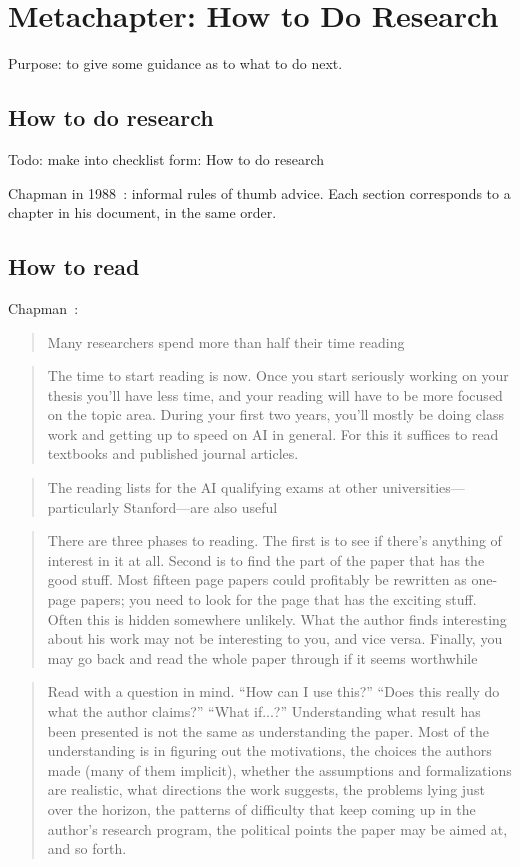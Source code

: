 \chapter{Metachapter: How to Do Research}

Purpose: to give some guidance as to what to do next.

\section{How to do research}
Todo: make into checklist form: How to do research \cite{chapman1988how}
\cite{hwang2008how}
\cite{desjardins2008how}

Chapman in 1988~\cite{chapman1988how}: informal rules of thumb advice. Each
section corresponds to a chapter in his document, in the same order.


\section{How to read}

Chapman~\cite{chapman1988how}:
\blockquote{Many researchers spend more than half their time reading}

\blockquote{The time to start reading is now. Once you start seriously working
on your thesis you’ll have less time, and your reading will have to be more
focused on the topic area. During your first two years, you’ll mostly be doing
class work and getting up to speed on AI in general. For this it suffices to
read textbooks and published journal articles.}

\blockquote{The reading lists for the AI qualifying exams at other
universities—particularly Stanford—are also useful}

\blockquote{There are three phases to reading. The
first is to see if there’s anything of interest in it at all. Second is to find
the part of the paper that has the good stuff. Most fifteen page papers could
profitably be rewritten as one-page papers; you need to look for the page that
has the exciting stuff. Often this is hidden somewhere unlikely. What the author
finds interesting about his work may not be interesting to you, and vice versa.
Finally, you may go back and read the whole paper through if it seems
worthwhile}

\blockquote{Read with a question in mind. “How can I use this?” “Does this really do
what the author claims?” “What if...?” Understanding what result has been presented
is not the same as understanding the paper. Most of the understanding
is in figuring out the motivations, the choices the authors made (many of them
implicit), whether the assumptions and formalizations are realistic, what directions
the work suggests, the problems lying just over the horizon, the patterns
of difficulty that keep coming up in the author’s research program, the political
points the paper may be aimed at, and so forth.}

